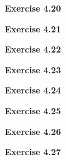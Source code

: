 \documentclass{article}
\begin{document}
\bigskip

\begin{framed}
    \noindent \textbf{Exercise 4.20}
    
    \medskip
    
    
\end{framed}


\bigskip

\begin{framed}
    \noindent \textbf{Exercise 4.21}
    
    \medskip
    
    
\end{framed}


\bigskip

\begin{framed}
    \noindent \textbf{Exercise 4.22}
    
    \medskip
    
    
\end{framed}


\bigskip

\begin{framed}
    \noindent \textbf{Exercise 4.23}
    
    \medskip
    
    
\end{framed}


\bigskip

\begin{framed}
    \noindent \textbf{Exercise 4.24}
    
    \medskip
    
    
\end{framed}


\bigskip

\begin{framed}
    \noindent \textbf{Exercise 4.25}
    
    \medskip
    
    
\end{framed}


\bigskip

\begin{framed}
    \noindent \textbf{Exercise 4.26}
    
    \medskip
    
    
\end{framed}


\bigskip

\begin{framed}
    \noindent \textbf{Exercise 4.27}
    
    \medskip
    
    
\end{framed}
\end{document}

